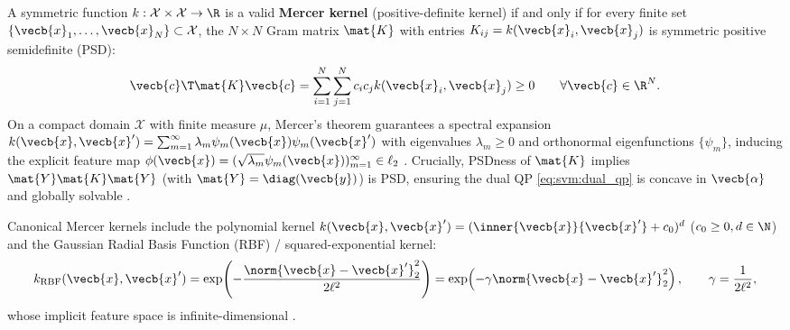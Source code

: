 \documentclass[../../../../master.tex]{subfiles}
\begin{document}
\begin{coremath}
A symmetric function $k : \mathcal{X} \times \mathcal{X} \to \R$ is a valid \textbf{Mercer kernel} (positive-definite kernel) if and only if for every finite set $\{\vecb{x}_1, \dots, \vecb{x}_N\} \subset \mathcal{X}$, the $N \times N$ Gram matrix $\mat{K}$ with entries $K_{ij} = k(\vecb{x}_i, \vecb{x}_j)$ is symmetric positive semidefinite (PSD):
\begin{equation}
  \vecb{c}\T \mat{K} \vecb{c} = \sum_{i=1}^N \sum_{j=1}^N c_i c_j k(\vecb{x}_i, \vecb{x}_j) \ge 0 \qquad \forall \vecb{c} \in \R^N.
  \label{eq:svm:mercer_psd}
\end{equation}
On a compact domain $\mathcal{X}$ with finite measure $\mu$, Mercer's theorem guarantees a spectral expansion $k(\vecb{x}, \vecb{x}') = \sum_{m=1}^\infty \lambda_m \psi_m(\vecb{x}) \psi_m(\vecb{x}')$ with eigenvalues $\lambda_m \ge 0$ and orthonormal eigenfunctions $\{\psi_m\}$, inducing the explicit feature map $\phi(\vecb{x}) = (\sqrt{\lambda_m}\psi_m(\vecb{x}))_{m=1}^\infty \in \ell_2$ . Crucially, PSDness of $\mat{K}$ implies $\mat{Y}\mat{K}\mat{Y}$ (with $\mat{Y} = \diag(\vecb{y})$) is PSD, ensuring the dual QP \eqref{eq:svm:dual_qp} is concave in $\vecb{\alpha}$ and globally solvable .
\end{coremath}

Canonical Mercer kernels include the polynomial kernel $k(\vecb{x}, \vecb{x}') = (\inner{\vecb{x}}{\vecb{x}'} + c_0)^d$ ($c_0 \ge 0, d \in \N$) and the Gaussian Radial Basis Function (RBF) / squared-exponential kernel:
\begin{equation}
  k_{\mathrm{RBF}}(\vecb{x}, \vecb{x}') = \exp\!\left(-\frac{\norm{\vecb{x} - \vecb{x}'}_2^2}{2\ell^2}\right) = \exp\!\left(-\gamma \norm{\vecb{x} - \vecb{x}'}_2^2\right), \qquad \gamma = \frac{1}{2\ell^2},
  \label{eq:svm:rbf_kernel}
\end{equation}
whose implicit feature space is infinite-dimensional  .
\end{document}
